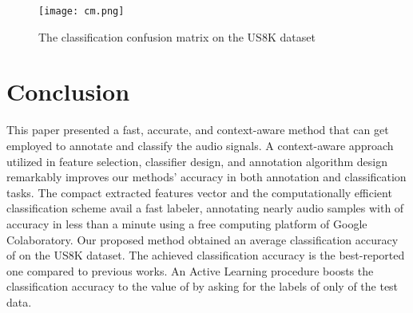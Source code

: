 \documentclass{article}
\begin{document}
\begin{figure}	
	\centering	
	\texttt{[image: cm.png]}  
	\caption{The classification confusion matrix on the US8K dataset}
	\label{fig: cm}
\end{figure}

\section{Conclusion}
\label{conclusion}
This paper presented a fast, accurate, and context-aware method that can get employed to annotate and classify the audio signals. A context-aware approach utilized in feature selection, classifier design, and annotation algorithm design remarkably improves our methods' accuracy in both annotation and classification tasks. The compact extracted features vector and the computationally efficient classification scheme avail a fast labeler, annotating nearly  audio samples with  of accuracy in less than a minute using a free computing platform of Google Colaboratory. Our proposed method obtained an average classification accuracy of  on the US8K dataset. The achieved classification accuracy is the best-reported one compared to previous works. An Active Learning procedure boosts the classification accuracy to the value of  by asking for the labels of only  of the test data.


  
\end{document}
